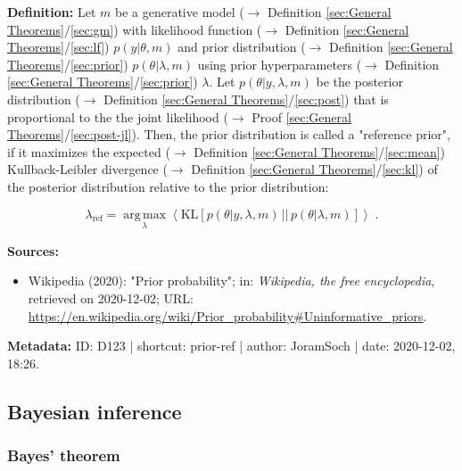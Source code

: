 \documentclass[a4paper,12pt,twoside]{book}
\begin{document}
\textbf{Definition:} Let $m$ be a generative model ($\rightarrow$ Definition \ref{sec:General Theorems}/\ref{sec:gm}) with likelihood function ($\rightarrow$ Definition \ref{sec:General Theorems}/\ref{sec:lf}) $p(y \vert \theta, m)$ and prior distribution ($\rightarrow$ Definition \ref{sec:General Theorems}/\ref{sec:prior}) $p(\theta \vert \lambda, m)$ using prior hyperparameters ($\rightarrow$ Definition \ref{sec:General Theorems}/\ref{sec:prior}) $\lambda$. Let $p(\theta \vert y, \lambda, m)$ be the posterior distribution ($\rightarrow$ Definition \ref{sec:General Theorems}/\ref{sec:post}) that is proportional to the the joint likelihood ($\rightarrow$ Proof \ref{sec:General Theorems}/\ref{sec:post-jl}). Then, the prior distribution is called a "reference prior", if it maximizes the expected ($\rightarrow$ Definition \ref{sec:General Theorems}/\ref{sec:mean}) Kullback-Leibler divergence ($\rightarrow$ Definition \ref{sec:General Theorems}/\ref{sec:kl}) of the posterior distribution relative to the prior distribution:

\begin{equation} \label{eq:prior-ref-prior-ref}
\lambda_{\mathrm{ref}} = \operatorname*{arg\,max}_{\lambda} \left\langle \mathrm{KL} \left[ p(\theta \vert y, \lambda, m) \, || \, p(\theta \vert \lambda, m) \right] \right\rangle \; .
\end{equation}


\vspace{1em}
\textbf{Sources:}
\begin{itemize}
\item Wikipedia (2020): "Prior probability"; in: \textit{Wikipedia, the free encyclopedia}, retrieved on 2020-12-02; URL: \url{https://en.wikipedia.org/wiki/Prior_probability#Uninformative_priors}.
\end{itemize}


\vspace{1em}
\textbf{Metadata:} ID: D123 | shortcut: prior-ref | author: JoramSoch | date: 2020-12-02, 18:26.
\vspace{1em}



\subsection{Bayesian inference}

\subsubsection[\textbf{Bayes' theorem}]{Bayes' theorem} \label{sec:bayes-th}
\setcounter{equation}{0}
\end{document}
